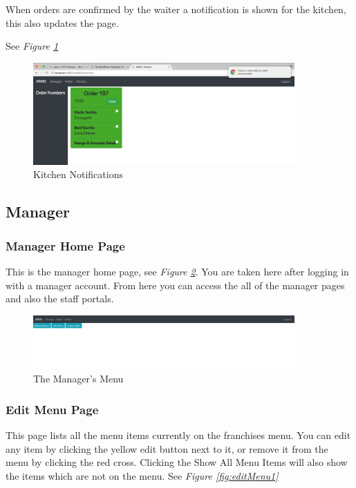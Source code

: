 \documentclass[12pt, twoside, a4paper]{report}
\begin{document}
When orders are confirmed by the waiter a notification is shown for the kitchen, this also updates the page.

See \textit{Figure \ref{fig:kitchen2}}

\begin{figure}[H]
  \centering
  \includegraphics[width=10cm]{Kitchen2.png}
  \caption{Kitchen Notifications}
  \label{fig:kitchen2}
\end{figure}

\subsection*{Manager}
\subsubsection*{Manager Home Page}
This is the manager home page, see \textit{Figure \ref{fig:manMenu}}. You are taken here after logging in with a manager account. From here you can access the all of the manager pages and also the staff portals.

\begin{figure}[H]
  \centering
  \includegraphics[width=10cm]{ManagerMenu.png}
  \caption{The Manager's Menu}
  \label{fig:manMenu}
\end{figure}

\subsubsection*{Edit Menu Page}
This page lists all the menu items currently on the franchises menu.
You can edit any item by clicking the yellow edit button next to it, or remove it from the menu by clicking the red cross.
Clicking the Show All Menu Items will also show the items which are not on the menu.
See \textit{Figure \ref{fig:editMenu1}}
\end{document}
